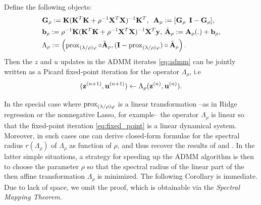\begin{lemma}
  Define the following objects:
  \begin{eqnarray*}
    \begin{aligned}
      &\mathbf{G}_{\rho} :=
      \mathbf{K}(\mathbf{K}^T\mathbf{K} + \rho^{-1}\mathbf{X}^T\mathbf{X})^{-1}\mathbf{K}^T,\hspace{.5em}
      \mathbf{A}_{\rho}:=[\mathbf{G}_{\rho}\hspace{.5em}\mathbf{I}-\mathbf{G}_{\rho}],\\
      &\mathbf{b}_{\rho} := \rho^{-1}\mathbf{K}(\mathbf{K}^T\mathbf{K} +
      \rho^{-1}\mathbf{X}^T\mathbf{X})^{-1}\mathbf{X}^T\mathbf{y},\hspace{.2em}\tilde{\mathbf{A}}_{\rho} :=
      \mathbf{A}_{\rho}(.) +  \mathbf{b}_{\rho},\\
      &\Lambda_{\rho} :=
        \left(\operatorname{prox}_{(\lambda/\rho)\varphi}\circ\tilde{\mathbf{A}}_{\rho},
        (\mathbf{I}-\operatorname{prox}_{(\lambda/\rho)\varphi})\circ\tilde{\mathbf{A}}_{\rho}\right).
    \end{aligned}
    \label{eq:factorize}
  \end{eqnarray*}
 Then the $z$ and $u$ updates in the ADMM iterates
\eqref{eq:admm} can be jointly written as a Picard fixed-point
iteration for the operator $\Lambda_{\rho}$, i.e
\begin{equation}
  (\mathbf{z}^{(n+1)}, \mathbf{u}^{(n+1)}) \leftarrow
  \Lambda_{\rho}(\mathbf{z}^{(n)}, \mathbf{u}^{(n)}).
      \label{eq:fixed_point}
\end{equation}
\label{thm:fixed_point}
\end{lemma}
 In the special case where
$\operatorname{prox}_{(\lambda/\rho)\varphi}$ is a linear transformation --as
in Ridge regression or the nonnegative
Lasso, for example-- the operator $\Lambda_{\rho}$ is linear so that the
fixed-point iteration
\eqref{eq:fixed_point} is a linear dynamical system. Moreover,
in such cases one can derive closed-form formulae for the spectral radius
$r(\Lambda_{\rho})$ of $\Lambda_{\rho}$ as function of $\rho$, and thus recover
the results of \citep{ghadimi2013optimal} and \citep{boley2013}. In the
latter simple situations, a strategy for speeding up the ADMM
algorithm is then to choose the parameter $\rho$ so that the spectral
radius of the linear part of the then affine transformation $\Lambda_\rho$
is minimized. The following Corollary is immediate. Due to lack of
space, we omit the proof, which is obtainable via the \textit{Spectral
  Mapping Theorem}.
